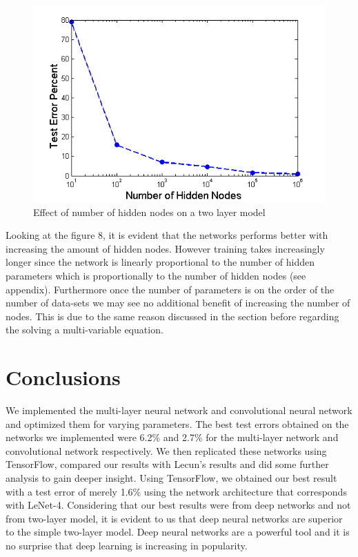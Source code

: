 \documentclass[12pt, twocolumn]{article}
\begin{document}
 \begin{figure}
 	\includegraphics[scale=.6]{errorvshiddennodes.png}
 	\caption{Effect of number of hidden nodes on a two layer model}
 	\label{fig:numhidden}
 \end{figure}
Looking at the figure 8, it is evident that the networks performs better with increasing the amount of hidden nodes. However training takes increasingly longer since the network is linearly proportional to the number of hidden parameters which is proportionally to the number of hidden nodes (see appendix). Furthermore once the number of parameters is on the order of the number of data-sets we may see no additional benefit of increasing the number of nodes. This is due to the same reason discussed in the section before regarding the solving a multi-variable equation.

\section{Conclusions}
We implemented the multi-layer neural network and convolutional neural network and optimized them for varying parameters. The best test errors obtained on the networks we implemented were 6.2\% and 2.7\% for the multi-layer network and convolutional network respectively. We then replicated these networks using TensorFlow, compared our results with Lecun's results and did some further analysis to gain deeper insight.
 Using TensorFlow, we obtained our best result with a test error of merely 1.6\% using the network architecture that corresponds with LeNet-4. Considering that our best results were from deep networks and not from two-layer model, it is evident to us that deep neural networks are superior to the simple two-layer model. Deep neural networks are a powerful tool and it is no surprise that deep learning is increasing in popularity.
\end{document}
